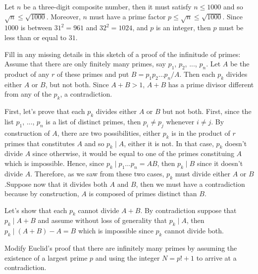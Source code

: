 \begin{solution}
    Let $n$ be a three-digit composite number, then it must satisfy $n \leq 1000$ and so $\sqrt{n} \leq \sqrt{1000}$. Moreover, $n$ must have a prime factor $p \leq \sqrt{n} \leq \sqrt{1000}$. Since $1000$ is between $31^2 = 961$ and $32^2 = 1024$, and $p$ is an integer, then $p$ must be less than or equal to $31$. \\ 
\end{solution}

\begin{exercise}
    Fill in any missing details in this sketch of a proof of the infinitude of primes: Assume that there are only finitely many primes, say $p_1$, $p_2$, ..., $p_n$. Let $A$ be the product of any $r$ of these primes and put $B = p_1p_2\dots p_n/A$. Then each $p_k$ divides either $A$ or $B$, but not both. Since $A + B > 1$, $A+B$ has a prime divisor different from any of the $p_k$, a contradiction. \\
\end{exercise}

\begin{solution}
    First, let's prove that each $p_k$ divides either $A$ or $B$ but not both. First, since the list $p_1$, ..., $p_n$ is a list of distinct primes, then $p_i \neq p_j$ whenever $i \neq j$. By construction of $A$, there are two possibilities, either $p_k$ is in the product of $r$ primes that constitutes $A$ and so $p_k \mid A$, either it is not. In that case, $p_k$ doesn't divide $A$ since otherwise, it would be equal to one of the primes constituing $A$ which is impossible. Hence, since $p_k \mid p_1 \dots p_n = AB$, then $p_k \mid B$ since it doesn't divide $A$. Therefore, as we saw from these two cases, $p_k$ must divide either $A$ or $B$.Suppose now that it divides both $A$ and $B$, then we must have a contradiction because by construction, $A$ is composed of primes distinct than $B$.
    
    Let's show that each $p_k$ cannot divide $A+B$. By contradiction suppose that $p_k \mid A+B$ and assume without loss of generality that $p_k \mid A$, then $p_k \mid (A+B) - A = B$ which is impossible since $p_k$ cannot divide both.\\
\end{solution}

\begin{exercise}
    Modify Euclid's proof that there are infinitely many primes by assuming the existence of a largest prime $p$ and using the integer $N = p! + 1$ to arrive at a contradiction. \\
\end{exercise}

